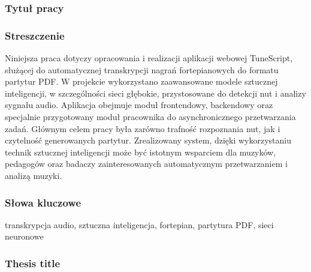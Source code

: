 \documentclass[a4paper,twoside,12pt]{book}
\begin{document}


\cleardoublepage

\rmfamily\normalfont
\pagestyle{empty}



\subsubsection*{Tytuł pracy} 
\Title

\subsubsection*{Streszczenie}  
Niniejsza praca dotyczy opracowania i realizacji aplikacji webowej TuneScript, służącej do automatycznej transkrypcji nagrań fortepianowych do formatu partytur PDF. W projekcie wykorzystano zaawansowane modele sztucznej inteligencji, w szczególności sieci głębokie, przystosowane do detekcji nut i analizy sygnału audio. Aplikacja obejmuje moduł frontendowy, backendowy oraz specjalnie przygotowany moduł pracownika do asynchronicznego przetwarzania zadań. Głównym celem pracy była zarówno trafność rozpoznania nut, jak i czytelność generowanych partytur. Zrealizowany system, dzięki wykorzystaniu technik sztucznej inteligencji może być istotnym wsparciem dla muzyków, pedagogów oraz badaczy zainteresowanych automatycznym przetwarzaniem i analizą muzyki.

\subsubsection*{Słowa kluczowe} 
transkrypcja audio, sztuczna inteligencja, fortepian, partytura PDF, sieci neuronowe

\vspace*{1em}  %

\subsubsection*{Thesis title} 
\begin{otherlanguage}{british}
  \TitleAlt
\end{otherlanguage}
\end{document}

